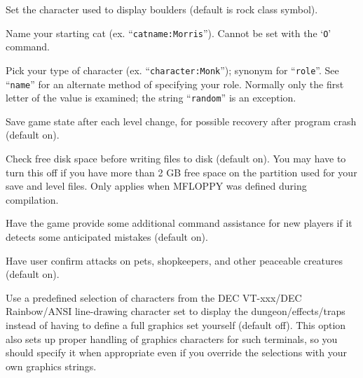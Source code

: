 \item[\ib{boulder}]
Set the character used to display boulders (default is rock class symbol).

\item[\ib{catname}]
Name your starting cat (ex. ``{\tt catname:Morris}'').
Cannot be set with the `{\tt O}' command.

\item[\ib{character}]
Pick your type of character (ex. ``{\tt character:Monk}'');
synonym for ``{\tt role}''.  See ``{\tt name}'' for an alternate method
of specifying your role.  Normally only the first letter of
the value is examined; the string ``{\tt random}'' is an exception.

\item[\ib{checkpoint}]
Save game state after each level change, for possible recovery after
program crash (default on).

\item[\ib{checkspace}]
Check free disk space before writing files to disk (default on).
You may have to turn this off if you have more than 2 GB free space
on the partition used for your save and level files.
Only applies when MFLOPPY was defined during compilation.

\item[\ib{cmdassist}]
Have the game provide some additional command assistance for 
new players if it detects some anticipated mistakes (default on).

\item[\ib{confirm}]
Have user confirm attacks on pets, shopkeepers, and other
peaceable creatures (default on).

\item[\ib{DECgraphics}]
Use a predefined selection of characters from the DEC VT-xxx/DEC
Rainbow/ANSI line-drawing character set to display the dungeon/effects/traps
instead of having to define a full graphics set yourself (default off).
This option also sets up proper handling of graphics
characters for such terminals, so you should specify it when appropriate
even if you override the selections with your own graphics strings.

